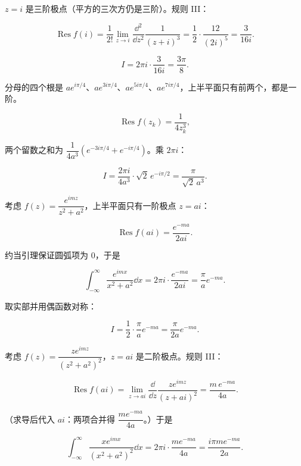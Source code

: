 \documentclass[11pt]{ctexart}
\renewcommand{\qbreak}{\needspace{0.45\textheight}}
\let\orighdr\hdr
\renewcommand{\hdr}[2]{\par\orighdr{#1}{#2}}
\begin{document}
\qbreak
{}

$z=i$ 是三阶极点（平方的三次方仍是三阶）。规则 III：

\[ \operatorname{Res}f(i)=\frac{1}{2!}\lim_{z\to i}\frac{\dd^{2}}{\dd z^{2}}\frac{1}{(z+i)^{3}}=\frac{1}{2}\cdot\frac{12}{(2i)^{5}}=\frac{3}{16i} . \]

\[ I=2\pi i\cdot\frac{3}{16i}=\frac{3\pi}{8} . \]

\qbreak
{}

分母的四个根是 $ae^{i\pi/4}$、$ae^{3i\pi/4}$、$ae^{5i\pi/4}$、$ae^{7i\pi/4}$，上半平面只有前两个，都是一阶。

\[ \operatorname{Res}f(z_k)=\frac{1}{4z_k^{3}} , \]

两个留数之和为 $\dfrac{1}{4a^{3}}\left(e^{-3i\pi/4}+e^{-i\pi/4}\right)$。乘 $2\pi i$：

\[ I=\frac{2\pi i}{4a^{3}}\cdot\sqrt2\,e^{-i\pi/2}=\frac{\pi}{\sqrt2\,a^{3}} . \]


\qbreak
{}

考虑 $f(z)=\dfrac{e^{imz}}{z^{2}+a^{2}}$，上半平面只有一阶极点 $z=ai$：

\[ \operatorname{Res}f(ai)=\frac{e^{-ma}}{2ai} . \]

约当引理保证圆弧项为 0，于是

\[ \int_{-\infty}^{\infty}\frac{e^{imx}}{x^{2}+a^{2}}\dd x=2\pi i\cdot\frac{e^{-ma}}{2ai}=\frac{\pi}{a}e^{-ma} . \]

取实部并用偶函数对称：

\[ I=\frac12\cdot\frac{\pi}{a}e^{-ma}=\frac{\pi}{2a}e^{-ma} . \]

\qbreak
{}

考虑 $f(z)=\dfrac{ze^{imz}}{(z^{2}+a^{2})^{2}}$，$z=ai$ 是二阶极点。规则 III：

\[ \operatorname{Res}f(ai)=\lim_{z\to ai}\frac{\dd}{\dd z}\frac{ze^{imz}}{(z+ai)^{2}}=\frac{m\,e^{-ma}}{4a} . \]

（求导后代入 $ai$：两项合并得 $\dfrac{m e^{-ma}}{4a}$。）于是

\[ \int_{-\infty}^{\infty}\frac{xe^{imx}}{(x^{2}+a^{2})^{2}}\dd x=2\pi i\cdot\frac{me^{-ma}}{4a}=\frac{i\pi m e^{-ma}}{2a} . \]
\end{document}
